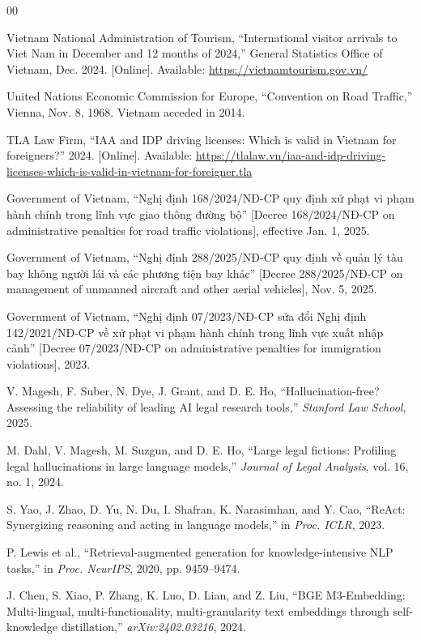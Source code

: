 \documentclass[conference, onecolumn]{IEEEtran}
\begin{document}
\begin{thebibliography}{00}

 Vietnam National Administration of Tourism, ``International visitor arrivals to Viet Nam in December and 12 months of 2024,'' General Statistics Office of Vietnam, Dec. 2024. [Online]. Available: \url{https://vietnamtourism.gov.vn/}

 United Nations Economic Commission for Europe, ``Convention on Road Traffic,'' Vienna, Nov. 8, 1968. Vietnam acceded in 2014.

 TLA Law Firm, ``IAA and IDP driving licenses: Which is valid in Vietnam for foreigners?'' 2024. [Online]. Available: \url{https://tlalaw.vn/iaa-and-idp-driving-licenses-which-is-valid-in-vietnam-for-foreigner.tla}

 Government of Vietnam, ``Nghị định 168/2024/NĐ-CP quy định xử phạt vi phạm hành chính trong lĩnh vực giao thông đường bộ'' [Decree 168/2024/NĐ-CP on administrative penalties for road traffic violations], effective Jan. 1, 2025.

 Government of Vietnam, ``Nghị định 288/2025/NĐ-CP quy định về quản lý tàu bay không người lái và các phương tiện bay khác'' [Decree 288/2025/NĐ-CP on management of unmanned aircraft and other aerial vehicles], Nov. 5, 2025.

 Government of Vietnam, ``Nghị định 07/2023/NĐ-CP sửa đổi Nghị định 142/2021/NĐ-CP về xử phạt vi phạm hành chính trong lĩnh vực xuất nhập cảnh'' [Decree 07/2023/NĐ-CP on administrative penalties for immigration violations], 2023.

 V. Magesh, F. Suber, N. Dye, J. Grant, and D. E. Ho, ``Hallucination-free? Assessing the reliability of leading AI legal research tools,'' \textit{Stanford Law School}, 2025.

 M. Dahl, V. Magesh, M. Suzgun, and D. E. Ho, ``Large legal fictions: Profiling legal hallucinations in large language models,'' \textit{Journal of Legal Analysis}, vol. 16, no. 1, 2024.

 S. Yao, J. Zhao, D. Yu, N. Du, I. Shafran, K. Narasimhan, and Y. Cao, ``ReAct: Synergizing reasoning and acting in language models,'' in \textit{Proc. ICLR}, 2023.

 P. Lewis et al., ``Retrieval-augmented generation for knowledge-intensive NLP tasks,'' in \textit{Proc. NeurIPS}, 2020, pp. 9459--9474.

 J. Chen, S. Xiao, P. Zhang, K. Luo, D. Lian, and Z. Liu, ``BGE M3-Embedding: Multi-lingual, multi-functionality, multi-granularity text embeddings through self-knowledge distillation,'' \textit{arXiv:2402.03216}, 2024.

\end{thebibliography}
\end{document}
